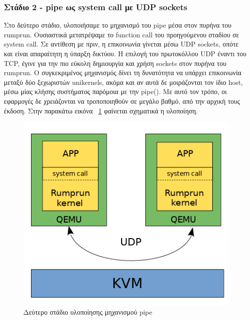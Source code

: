 \subsubsection{Στάδιο 2 - pipe ως system call με UDP sockets}

Στο δεύτερο στάδιο, υλοποιήσαμε το μηχανισμό του pipe μέσα στον πυρήνα του
rumprun. Ουσιαστικά μετατρέψαμε το function call του προηγούμενου σταδίου σε
system call. Σε αντίθεση με πριν, η επικοινωνία γίνεται μέσω UDP sockets, οπότε
και είναι απαραίτητη η ύπαρξη δικτύου. Η επιλογή του πρωτοκόλλου UDP έναντι του
TCP, έγινε για την πιο εύκολη δημιουργία και χρήση sockets στον πυρήνα του
rumprun. Ο συγκεκριμένος μηχανισμός δίνει τη δυνατότητα να υπάρχει επικοινωνία
μεταξύ δύο ξεχωριστών unikernels, ακόμα και αν αυτά δε μοιράζονται τον ίδιο
host, μέσω μίας κλήσης συστήματος παρόμοια με την pipe(). Με αυτό τον τρόπο, οι
εφαρμογές δε χρειάζονται να τροποποιηθούν σε μεγάλο βαθμό, από την αρχική τους
έκδοση. Στην παρακάτω εικόνα ~\ref{fig4_3} φαίνεται σχηματικά η υλοποίηση.

\begin{figure}[htp]
\centering
\includegraphics[scale=0.7]{figures/pipe_stage2.png}
\caption{Δεύτερο στάδιο υλοποίησης μηχανισμού pipe\label{fig4_3}}
\end{figure}


